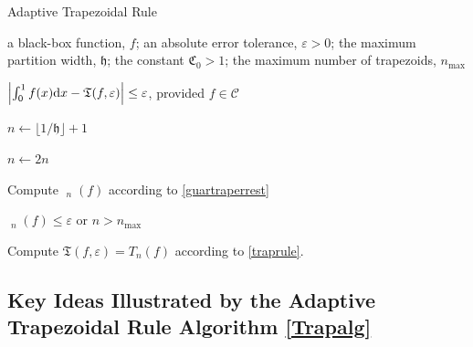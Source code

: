 \documentclass[11pt]{NSFamsart}
\newcommand{\hcut}{\mathfrak{h}}
\DeclareMathOperator{\err}{err}
\DeclareMathOperator{\herr}{\widehat{\err}}
\def\dif{\textup{d}}
\newcommand{\cc}{\mathcal{C}}
\newcommand{\ct}{\mathfrak{T}}
\newcommand{\fC}{\mathfrak{C}}
\def\abs#1{\ensuremath{\left \lvert #1 \right \rvert}}
\begin{document}
\begin{algorithm}
	\caption{Adaptive Trapezoidal Rule \label{Trapalg}} 
	\begin{algorithmic}[1]
		\REQUIRE a black-box function, $f$; an absolute error tolerance,
		$\varepsilon>0$; the maximum partition width, $\hcut$; the constant $\fC_0 > 1$;  the 
		maximum number of trapezoids, $n_{\max}$

\ENSURE $\abs{\int_0^1 f(x) \dif x - \ct(f,\varepsilon)} \le \varepsilon$, provided $f \in \cc$

\STATE $n \leftarrow \lfloor 1 /\hcut \rfloor + 1$

\REPEAT

\STATE $n \leftarrow 2n$

\STATE Compute $\herr_n(f)$ according to \eqref{guartraperrest}

\UNTIL  $\herr_n(f) \le \varepsilon$ or $n > n_{\max}$

\STATE Compute $\ct(f,\varepsilon) = T_n(f)$ according to \eqref{traprule}.
		
\end{algorithmic}
	\end{algorithm}


\subsection{Key Ideas Illustrated by the Adaptive Trapezoidal Rule Algorithm 
\ref{Trapalg}} 
\label{subsect:trap}
\end{document}

